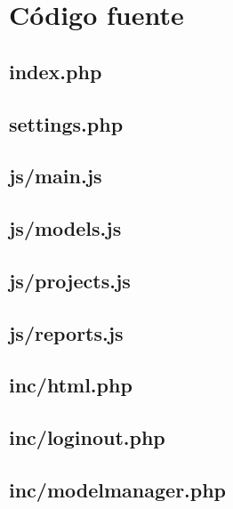 \documentclass[11pt,a4paper,spanish,twoside]{book}
\begin{document}
\section{Código fuente}
\subsection{index.php}
%

\subsection{settings.php}
%

\subsection{js/main.js}
%

\subsection{js/models.js}
%

\subsection{js/projects.js}
%

\subsection{js/reports.js}
%

\subsection{inc/html.php}
%

\subsection{inc/loginout.php}
%

\subsection{inc/modelmanager.php}
%
\end{document}
